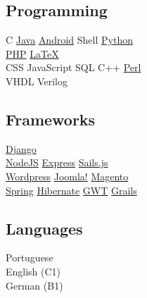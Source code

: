 \documentclass[]{willianpaixao-resume}
\begin{document}
\begin{minipage}[t]{0.35\textwidth}
\subsection{Programming}
C \textbullet
\href{https://www.oracle.com/java/}{Java} \textbullet{}
\href{http://android.com}{Android} \textbullet{}
Shell \textbullet{}
\href{http://www.python.org}{Python}\\
\href{http://www.php.net}{PHP} \textbullet{}
\href{http://www.latex-project.org}{\LaTeX} \\
CSS \textbullet{}
JavaScript \textbullet{}
SQL \textbullet{}
C++ \textbullet{}
\href{https://www.perl.org/}{Perl} \\
VHDL \textbullet{}
Verilog
\sectionsep

\subsection{Frameworks}
\href{https://www.djangoproject.com/}{Django} \\
\href{https://nodejs.org/en/}{NodeJS} \textbullet
\href{https://expressjs.com/}{Express} \textbullet
\href{http://sailsjs.org/}{Sails.js} \\
\href{https://wordpress.com/}{Wordpress} \textbullet
\href{https://www.joomla.org/}{Joomla!} \textbullet
\href{https://magento.com/}{Magento} \\
\href{https://spring.io/}{Spring} \textbullet
\href{http://hibernate.org/}{Hibernate} \textbullet
\href{http://www.gwtproject.org/}{GWT} \textbullet
\href{https://grails.org/}{Grails}
\sectionsep

\subsection{Languages}
Portuguese \\
English (C1) \\
German (B1)


\end{minipage} 
\end{document}
